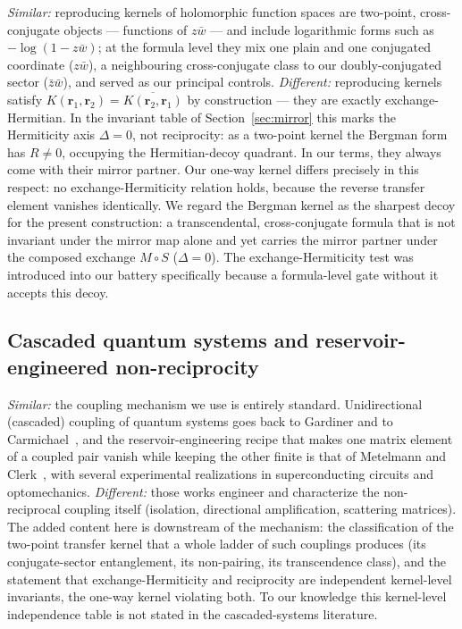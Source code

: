 \documentclass[11pt,a4paper]{article}
\newcommand{\zb}{\bar{z}}
\newcommand{\wb}{\bar{w}}
\begin{document}
\emph{Similar:} reproducing kernels of holomorphic function spaces are two-point,
cross-conjugate objects --- functions of $z\wb$ --- and include logarithmic forms
such as $-\log(1 - z\wb)$; at the formula level they mix one plain and one
conjugated coordinate ($z\wb$), a neighbouring cross-conjugate class to our
doubly-conjugated sector ($\zb\wb$), and served as our principal controls.
\emph{Different:} reproducing kernels satisfy
$K(\mathbf{r}_1, \mathbf{r}_2) = \overline{K(\mathbf{r}_2, \mathbf{r}_1)}$ by
construction --- they are exactly exchange-Hermitian. In the invariant table
of Section~\ref{sec:mirror} this marks the Hermiticity axis $\Delta = 0$, not
reciprocity: as a two-point kernel the Bergman form has $R \neq 0$, occupying
the Hermitian-decoy quadrant. In our terms, they always come with their mirror
partner. Our
one-way kernel differs precisely in this respect: no exchange-Hermiticity
relation holds, because the reverse transfer element vanishes identically. We
regard the Bergman kernel as the sharpest decoy for the present construction: a
transcendental, cross-conjugate formula that is not invariant under the
mirror map alone and yet carries the mirror partner under the composed
exchange $M \circ S$ ($\Delta = 0$). The exchange-Hermiticity test
was introduced into our battery specifically because a formula-level gate
without it accepts this decoy.

\subsection{Cascaded quantum systems and reservoir-engineered non-reciprocity}

\emph{Similar:} the coupling mechanism we use is entirely standard.
Unidirectional (cascaded) coupling of quantum systems goes back to Gardiner and
to Carmichael~\cite{Gardiner1993,Carmichael1993}, and the reservoir-engineering
recipe that makes one matrix element of a coupled pair vanish while keeping the
other finite is that of Metelmann and Clerk~\cite{MetelmannClerk2015}, with
several experimental realizations in superconducting circuits and
optomechanics. \emph{Different:} those works engineer and characterize the
non-reciprocal coupling itself (isolation, directional amplification,
scattering matrices). The added content here is downstream of the mechanism:
the classification of the two-point transfer kernel that a whole ladder of such
couplings produces (its conjugate-sector entanglement, its non-pairing, its
transcendence class), and the statement that exchange-Hermiticity and
reciprocity are independent kernel-level invariants, the one-way kernel
violating both. To our knowledge this kernel-level independence table is not
stated in the cascaded-systems literature.
\end{document}
